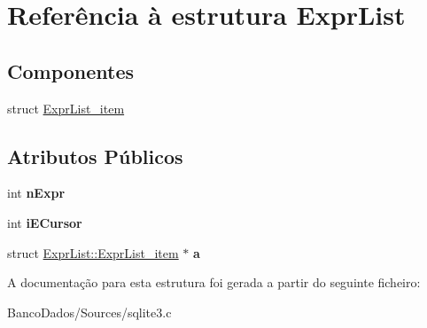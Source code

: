 \hypertarget{struct_expr_list}{\section{Referência à estrutura Expr\-List}
\label{struct_expr_list}
}
\subsection*{Componentes}
\begin{DoxyCompactItemize}
\item 
struct \hyperlink{struct_expr_list_1_1_expr_list__item}{Expr\-List\-\_\-item}
\end{DoxyCompactItemize}
\subsection*{Atributos Públicos}
\begin{DoxyCompactItemize}
\item 
\hypertarget{struct_expr_list_a88bdbd62cce306124eea63ae9f80ec33}{int {\bfseries n\-Expr}}\label{struct_expr_list_a88bdbd62cce306124eea63ae9f80ec33}

\item 
\hypertarget{struct_expr_list_aab870b9af60d25992f8672331d951ca0}{int {\bfseries i\-E\-Cursor}}\label{struct_expr_list_aab870b9af60d25992f8672331d951ca0}

\item 
\hypertarget{struct_expr_list_a02a4222d2dc4da64dcec416188abc16c}{struct \hyperlink{struct_expr_list_1_1_expr_list__item}{Expr\-List\-::\-Expr\-List\-\_\-item} $\ast$ {\bfseries a}}\label{struct_expr_list_a02a4222d2dc4da64dcec416188abc16c}

\end{DoxyCompactItemize}


A documentação para esta estrutura foi gerada a partir do seguinte ficheiro\-:\begin{DoxyCompactItemize}
\item 
Banco\-Dados/\-Sources/sqlite3.\-c\end{DoxyCompactItemize}
